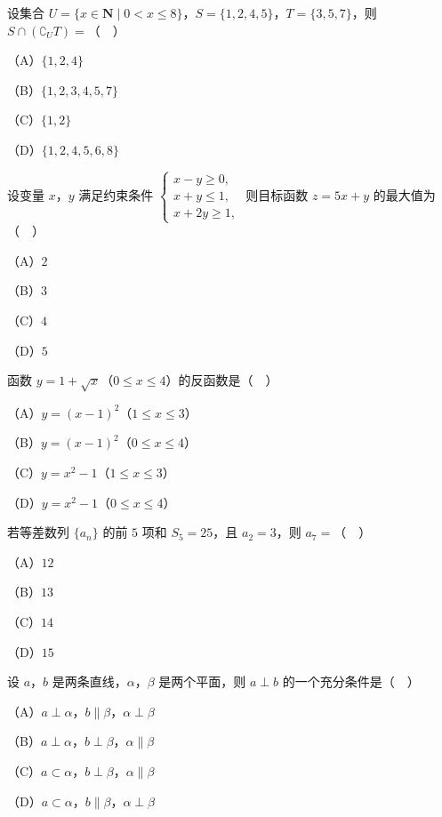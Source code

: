 


\begin{question}
设集合 $U=\{x\in\mathbf N\mid0<x\leqslant8\}$，$S=\{1,2,4,5\}$，$T=\{3,5,7\}$，则 $S\cap(\complement_UT)=$（　）

（A）$\{1,2,4\}$

（B）$\{1,2,3,4,5,7\}$

（C）$\{1,2\}$

（D）$\{1,2,4,5,6,8\}$

\end{question}
\begin{question}
设变量 $x$，$y$ 满足约束条件 $\begin{cases}x-y\geqslant0,\\ x+y\leqslant1,\\ x+2y\geqslant1,\end{cases}$ 则目标函数 $z=5x+y$ 的最大值为（　）

（A）$2$

（B）$3$

（C）$4$

（D）$5$

\end{question}
\begin{question}
函数 $y=1+\sqrt x$（$0\leqslant x\leqslant4$）的反函数是（　）

（A）$y=(x-1)^2$（$1\leqslant x\leqslant3$）

（B）$y=(x-1)^2$（$0\leqslant x\leqslant4$）

（C）$y=x^2-1$（$1\leqslant x\leqslant3$）

（D）$y=x^2-1$（$0\leqslant x\leqslant4$）

\end{question}
\begin{question}
若等差数列 $\{a_n\}$ 的前 $5$ 项和 $S_5=25$，且 $a_2=3$，则 $a_7=$（　）

（A）$12$

（B）$13$

（C）$14$

（D）$15$

\end{question}
\begin{question}
设 $a$，$b$ 是两条直线，$\alpha$，$\beta$ 是两个平面，则 $a\perp b$ 的一个充分条件是（　）

（A）$a\perp\alpha$，$b\parallel\beta$，$\alpha\perp\beta$

（B）$a\perp\alpha$，$b\perp\beta$，$\alpha\parallel\beta$

（C）$a\subset\alpha$，$b\perp\beta$，$\alpha\parallel\beta$

（D）$a\subset\alpha$，$b\parallel\beta$，$\alpha\perp\beta$

\end{question}
